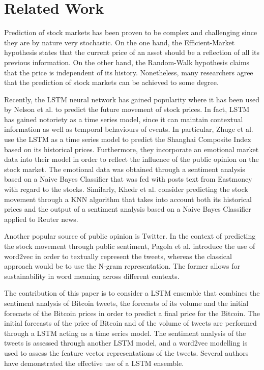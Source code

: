 \documentclass[conference]{IEEEtran}
\begin{document}
\section{Related Work}
\par Prediction of stock markets has been proven to be complex and challenging since they are by nature very stochastic. On the one hand, the Efficient-Market hypothesis states that the current price of an asset should be a reflection of all its previous information. On the other hand, the Random-Walk hypothesis claims that the price is independent of its history. Nonetheless, many researchers agree that the prediction of stock markets can be achieved to some degree.  
\par Recently, the LSTM neural network has gained popularity where it has been used by Nelson et al. \cite{LSTM Stock} to predict the future movement of stock prices. In fact, LSTM has gained notoriety as a time series model, since it can maintain contextual information as well as temporal behaviours of events. In particular, Zhuge et al. \cite{LSTM Emotional} use the LSTM as a time series model to predict the Shanghai Composite Index based on its historical prices. Furthermore, they incorporate an emotional market data into their model in order to reflect the influence of the public opinion on the stock market. The emotional data was obtained through a sentiment analysis based on a Naive Bayes Classifier that was fed with posts text from Eastmoney with regard to the stocks. Similarly, Khedr et al. \cite{Behavior} consider predicting the stock movement through a KNN algorithm that takes into account both its historical prices and the output of a sentiment analysis based on a Naive Bayes Classifier applied to Reuter news. 
\par Another popular source of public opinion is Twitter. In the context of predicting the stock movement through public sentiment, Pagola et al. \cite{word2vec Twitter} introduce the use of word2vec in order to textually represent the tweets, whereas the classical approach would be to use the N-gram representation. The former allows for sustainability in word meaning across different contexts.
\par The contribution of this paper is to consider a LSTM ensemble that combines the sentiment analysis of Bitcoin tweets, the forecasts of its volume and the initial forecasts of the Bitcoin prices in order to predict a final price for the Bitcoin. The initial forecasts of the price of Bitcoin and of the volume of tweets are performed through a LSTM acting as a time series model. The sentiment analysis of the tweets is assessed through another LSTM model, and a word2vec modelling is used to assess the feature vector representations of the tweets. Several authors \cite{LSTM Ensemble 1} have demonstrated the effective use of a LSTM ensemble. 
\end{document}
